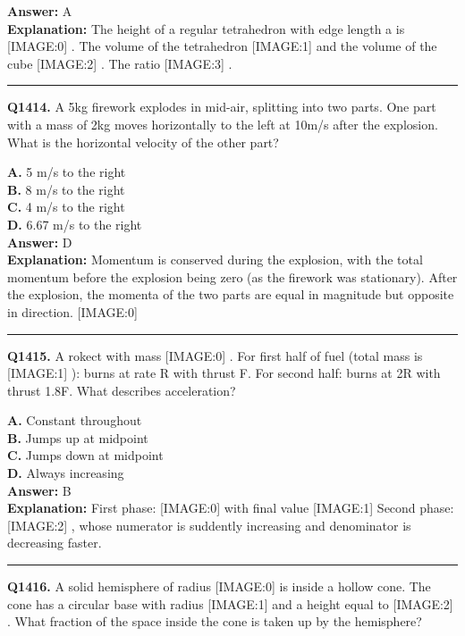 \documentclass[12pt]{article}
\begin{document}
\textbf{Answer:} A \\
\textbf{Explanation:} The height of a regular tetrahedron with edge length a
is
[IMAGE:0]
. The volume of the tetrahedron
[IMAGE:1]
and the volume of the cube
[IMAGE:2]
. The ratio
[IMAGE:3]
.

\hrule
\vspace{1em}


\noindent
\textbf{Q1414.} A 5kg firework explodes in mid-air, splitting into two parts. One part with a mass of 2kg moves horizontally to the left at 10m/s after the explosion. What is the horizontal velocity of the other part?



\textbf{A.} 5 m/s to the right \\
\textbf{B.} 8 m/s to the right \\
\textbf{C.} 4 m/s to the right \\
\textbf{D.} 6.67 m/s to the right \\

\textbf{Answer:} D \\
\textbf{Explanation:} Momentum is conserved during the explosion, with the total momentum before the explosion being zero (as the firework was stationary). After the explosion, the momenta of the two parts are equal in magnitude but opposite in direction.
[IMAGE:0]

\hrule
\vspace{1em}


\noindent
\textbf{Q1415.} A rokect with mass
[IMAGE:0]
. For first half of fuel (total mass is
[IMAGE:1]
): burns at rate R with thrust F. For second half: burns at 2R with thrust 1.8F.
What describes acceleration?



\textbf{A.} Constant throughout \\
\textbf{B.} Jumps up at midpoint \\
\textbf{C.} Jumps down at midpoint \\
\textbf{D.} Always increasing \\

\textbf{Answer:} B \\
\textbf{Explanation:} First phase:
[IMAGE:0]
with final value
[IMAGE:1]
Second phase:
[IMAGE:2]
, whose numerator is suddently increasing and denominator is decreasing faster.

\hrule
\vspace{1em}


\noindent
\textbf{Q1416.} A solid hemisphere of radius
[IMAGE:0]
is inside a hollow cone. The cone has a circular base with radius
[IMAGE:1]
and a height equal to
[IMAGE:2]
. What fraction of the space inside the cone is taken up by the hemisphere?
\end{document}
